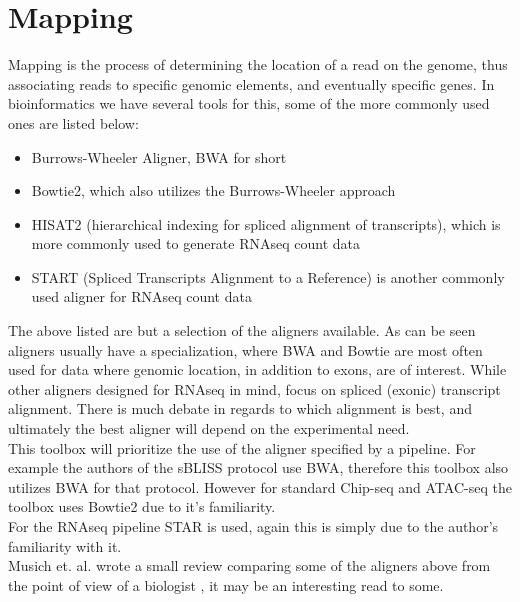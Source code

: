 \section{Mapping \label{sec:mapping}}
Mapping is the process of determining the location of a read on the genome, thus associating reads to specific genomic elements, and eventually specific genes. In bioinformatics we have several tools for this, some of the more commonly used ones are listed below:
\begin{itemize}
\item Burrows-Wheeler Aligner, BWA for short \cite{bwa1,bwa2}
\item Bowtie2, which also utilizes the Burrows-Wheeler approach \cite{bowtie2}
\item HISAT2 (hierarchical indexing for spliced alignment of transcripts), which is more commonly used to generate RNAseq count data \cite{hisat}
\item START (Spliced Transcripts Alignment to a Reference) is another commonly used aligner for RNAseq count data \cite{star}
\end{itemize}
The above listed are but a selection of the aligners available. As can be seen aligners usually have a specialization, where BWA and Bowtie are most often used for data where genomic location, in addition to exons, are of interest. While other aligners designed for RNAseq in mind, focus on spliced (exonic) transcript alignment. There is much debate in regards to which alignment is best, and ultimately the best aligner will depend on the experimental need.\\
This toolbox will prioritize the use of the aligner specified by a pipeline. For example the authors of the sBLISS protocol use BWA, therefore this toolbox also utilizes BWA for that protocol. However for standard Chip-seq and ATAC-seq the toolbox uses Bowtie2 due to it's familiarity.\\
For the RNAseq pipeline STAR is used, again this is simply due to the author's familiarity with it.\\
Musich et. al. wrote a small review comparing some of the aligners above from the point of view of a biologist \cite{musich2021comparison}, it may be an interesting read to some.

